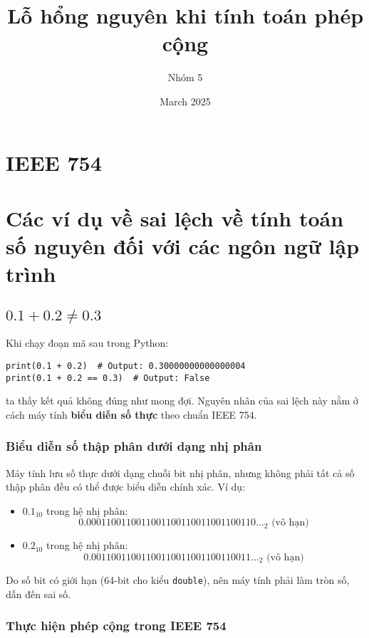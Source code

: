 \documentclass{article}
\title{Lỗ hổng nguyên khi tính toán phép cộng}
\author{Nhóm 5}
\date{March 2025}
\begin{document}
\maketitle
\section{IEEE 754}


\section{Các ví dụ về sai lệch về tính toán số nguyên đối với các ngôn ngữ lập trình}

\subsection{\(0.1 + 0.2 \neq 0.3\)}

Khi chạy đoạn mã sau trong Python:
\begin{verbatim}
print(0.1 + 0.2)  # Output: 0.30000000000000004
print(0.1 + 0.2 == 0.3)  # Output: False
\end{verbatim}
ta thấy kết quả không đúng như mong đợi. Nguyên nhân của sai lệch này nằm ở cách máy tính \textbf{biểu diễn số thực} theo chuẩn IEEE 754.

\subsubsection{Biểu diễn số thập phân dưới dạng nhị phân}

Máy tính lưu số thực dưới dạng chuỗi bit nhị phân, nhưng không phải tất cả số thập phân đều có thể được biểu diễn chính xác. Ví dụ:

\begin{itemize}
    \item \(0.1_{10}\) trong hệ nhị phân:
    \[
    0.0001100110011001100110011001100110..._2
    \text{ (vô hạn)}
    \]
    \item \(0.2_{10}\) trong hệ nhị phân:
    \[
    0.00110011001100110011001100110011..._2
    \text{ (vô hạn)}
    \]
\end{itemize}

Do số bit có giới hạn (64-bit cho kiểu \texttt{double}), nên máy tính phải làm tròn số, dẫn đến sai số.

\subsubsection{Thực hiện phép cộng trong IEEE 754}
\end{document}
